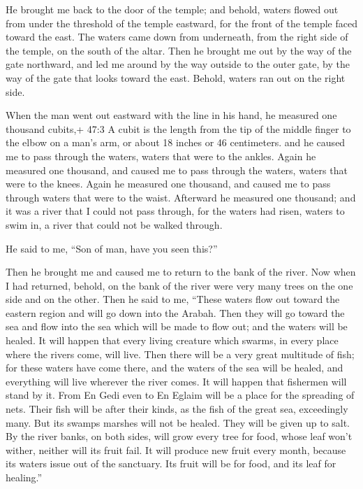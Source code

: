  He brought me back to the door of the temple; and behold,
waters flowed out from under the threshold of the temple eastward, for
the front of the temple faced toward the east. The waters came down from
underneath, from the right side of the temple, on the south of the
altar.  Then he brought me out by the way of the gate
northward, and led me around by the way outside to the outer gate, by
the way of the gate that looks toward the east. Behold, waters ran out
on the right side.

 When the man went out eastward with the line in his hand,
he measured one thousand cubits,+ 47:3 A cubit is the length from the
tip of the middle finger to the elbow on a man's arm, or about 18 inches
or 46 centimeters. and he caused me to pass through the waters, waters
that were to the ankles.  Again he measured one thousand,
and caused me to pass through the waters, waters that were to the knees.
Again he measured one thousand, and caused me to pass through waters
that were to the waist.  Afterward he measured one thousand;
and it was a river that I could not pass through, for the waters had
risen, waters to swim in, a river that could not be walked through.

 He said to me, ``Son of man, have you seen this?''

Then he brought me and caused me to return to the bank of the river.
 Now when I had returned, behold, on the bank of the river
were very many trees on the one side and on the other.  Then
he said to me, ``These waters flow out toward the eastern region and
will go down into the Arabah. Then they will go toward the sea and flow
into the sea which will be made to flow out; and the waters will be
healed.  It will happen that every living creature which
swarms, in every place where the rivers come, will live. Then there will
be a very great multitude of fish; for these waters have come there, and
the waters of the sea will be healed, and everything will live wherever
the river comes.  It will happen that fishermen will stand
by it. From En Gedi even to En Eglaim will be a place for the spreading
of nets. Their fish will be after their kinds, as the fish of the great
sea, exceedingly many.  But its swamps marshes will not be
healed. They will be given up to salt.  By the river banks,
on both sides, will grow every tree for food, whose leaf won't wither,
neither will its fruit fail. It will produce new fruit every month,
because its waters issue out of the sanctuary. Its fruit will be for
food, and its leaf for healing.''

